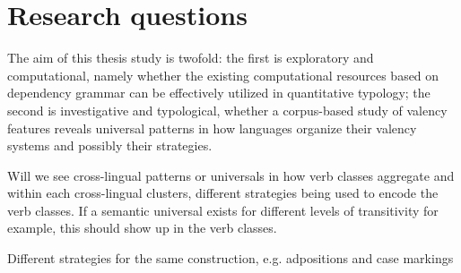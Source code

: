\section{Research questions}

The aim of this thesis study is twofold: the first is exploratory and computational, namely whether the existing computational resources based on dependency grammar can be effectively utilized in quantitative typology; the second is investigative and typological, whether a corpus-based study of valency features reveals universal patterns in how languages organize their valency systems and possibly their strategies.


Will we see cross-lingual patterns or universals in how verb classes aggregate and within each cross-lingual clusters, different strategies being used to encode the verb classes. If a semantic universal exists for different levels of transitivity for example, this should show up in the verb classes.

Different strategies for the same construction, e.g. adpositions and case markings

